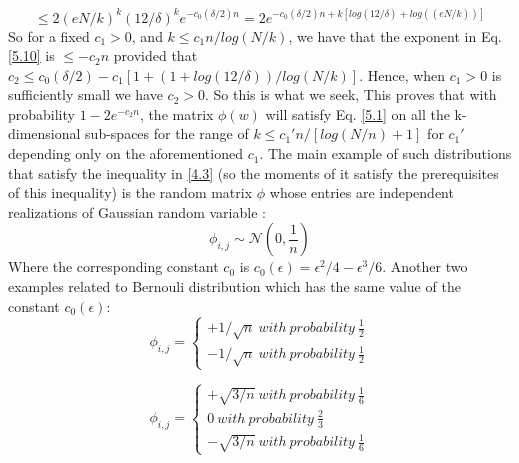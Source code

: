 \begin{equation}
    \leq  2(eN/k)^k(12/\delta)^ke^{-c_0(\delta/2)n}=2e^{-c_0(\delta/2)n+k[log(12/\delta)+log((eN/k))]}
\label{5.10}
\end{equation}{}
So for a fixed $c_1>0$, and $k\leq c_1n/log(N/k) $, we have that the exponent in Eq. \ref{5.10} is $\leq -c_2n$ provided that $c_2\leq c_0(\delta/2)-c_1[1+(1+log(12/\delta))/log(N/k)]$. Hence, when $c_1>0$ is sufficiently small we have $c_2>0$. So this is what we seek, This proves that with probability $1-2e^{-c_2n}$, the matrix $\phi(w)$ will satisfy Eq. \ref{5.1} on all the k-dimensional sub-spaces for the range of $k\leq c_1' n/[log(N/n) + 1]$ for $c_1'$ depending only on the aforementioned $c_1$.\newline 
The main example of such distributions that satisfy the inequality in \eqref{4.3} (so the moments of it satisfy the prerequisites of this inequality)  is the random matrix $\phi$ whose entries are independent realizations of Gaussian random variable \citep{concentration_kashin}:
\begin{equation}
    \phi_{i,j}\sim \mathcal{N}(0,\frac{1}{n})
\end{equation}
Where the corresponding constant $c_0$ is $c_0(\epsilon)=\epsilon^2/4-\epsilon^3/6$.
Another two examples related to Bernouli distribution which has the same value of the constant $c_0(\epsilon)$:
\begin{equation}
    \phi_{i,j}= 
    \left\{\begin{matrix}
    +1/\sqrt{n} ~ with ~probability ~\frac{1}{2}
\\ 
-1/\sqrt{n} ~ with ~probability ~\frac{1}{2}
\end{matrix}\right.
\end{equation}

\begin{equation}
    \phi_{i,j}= 
    \left\{\begin{matrix}
    +\sqrt{3/n} ~ with ~probability ~\frac{1}{6}
\\ 
0 ~ with ~probability ~\frac{2}{3}
\\
 -\sqrt{3/n} ~ with ~probability ~\frac{1}{6}

\end{matrix}\right.
\end{equation}


